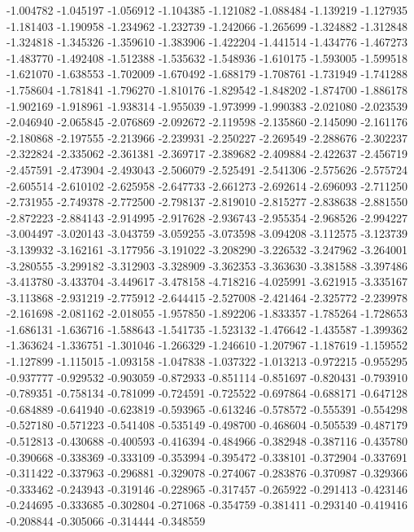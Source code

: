 -1.004782
-1.045197
-1.056912
-1.104385
-1.121082
-1.088484
-1.139219
-1.127935
-1.181403
-1.190958
-1.234962
-1.232739
-1.242066
-1.265699
-1.324882
-1.312848
-1.324818
-1.345326
-1.359610
-1.383906
-1.422204
-1.441514
-1.434776
-1.467273
-1.483770
-1.492408
-1.512388
-1.535632
-1.548936
-1.610175
-1.593005
-1.599518
-1.621070
-1.638553
-1.702009
-1.670492
-1.688179
-1.708761
-1.731949
-1.741288
-1.758604
-1.781841
-1.796270
-1.810176
-1.829542
-1.848202
-1.874700
-1.886178
-1.902169
-1.918961
-1.938314
-1.955039
-1.973999
-1.990383
-2.021080
-2.023539
-2.046940
-2.065845
-2.076869
-2.092672
-2.119598
-2.135860
-2.145090
-2.161176
-2.180868
-2.197555
-2.213966
-2.239931
-2.250227
-2.269549
-2.288676
-2.302237
-2.322824
-2.335062
-2.361381
-2.369717
-2.389682
-2.409884
-2.422637
-2.456719
-2.457591
-2.473904
-2.493043
-2.506079
-2.525491
-2.541306
-2.575626
-2.575724
-2.605514
-2.610102
-2.625958
-2.647733
-2.661273
-2.692614
-2.696093
-2.711250
-2.731955
-2.749378
-2.772500
-2.798137
-2.819010
-2.815277
-2.838638
-2.881550
-2.872223
-2.884143
-2.914995
-2.917628
-2.936743
-2.955354
-2.968526
-2.994227
-3.004497
-3.020143
-3.043759
-3.059255
-3.073598
-3.094208
-3.112575
-3.123739
-3.139932
-3.162161
-3.177956
-3.191022
-3.208290
-3.226532
-3.247962
-3.264001
-3.280555
-3.299182
-3.312903
-3.328909
-3.362353
-3.363630
-3.381588
-3.397486
-3.413780
-3.433704
-3.449617
-3.478158
-4.718216
-4.025991
-3.621915
-3.335167
-3.113868
-2.931219
-2.775912
-2.644415
-2.527008
-2.421464
-2.325772
-2.239978
-2.161698
-2.081162
-2.018055
-1.957850
-1.892206
-1.833357
-1.785264
-1.728653
-1.686131
-1.636716
-1.588643
-1.541735
-1.523132
-1.476642
-1.435587
-1.399362
-1.363624
-1.336751
-1.301046
-1.266329
-1.246610
-1.207967
-1.187619
-1.159552
-1.127899
-1.115015
-1.093158
-1.047838
-1.037322
-1.013213
-0.972215
-0.955295
-0.937777
-0.929532
-0.903059
-0.872933
-0.851114
-0.851697
-0.820431
-0.793910
-0.789351
-0.758134
-0.781099
-0.724591
-0.725522
-0.697864
-0.688171
-0.647128
-0.684889
-0.641940
-0.623819
-0.593965
-0.613246
-0.578572
-0.555391
-0.554298
-0.527180
-0.571223
-0.541408
-0.535149
-0.498700
-0.468604
-0.505539
-0.487179
-0.512813
-0.430688
-0.400593
-0.416394
-0.484966
-0.382948
-0.387116
-0.435780
-0.390668
-0.338369
-0.333109
-0.353994
-0.395472
-0.338101
-0.372904
-0.337691
-0.311422
-0.337963
-0.296881
-0.329078
-0.274067
-0.283876
-0.370987
-0.329366
-0.333462
-0.243943
-0.319146
-0.228965
-0.317457
-0.265922
-0.291413
-0.423146
-0.244695
-0.333685
-0.302804
-0.271068
-0.354759
-0.381411
-0.293140
-0.419416
-0.208844
-0.305066
-0.314444
-0.348559
